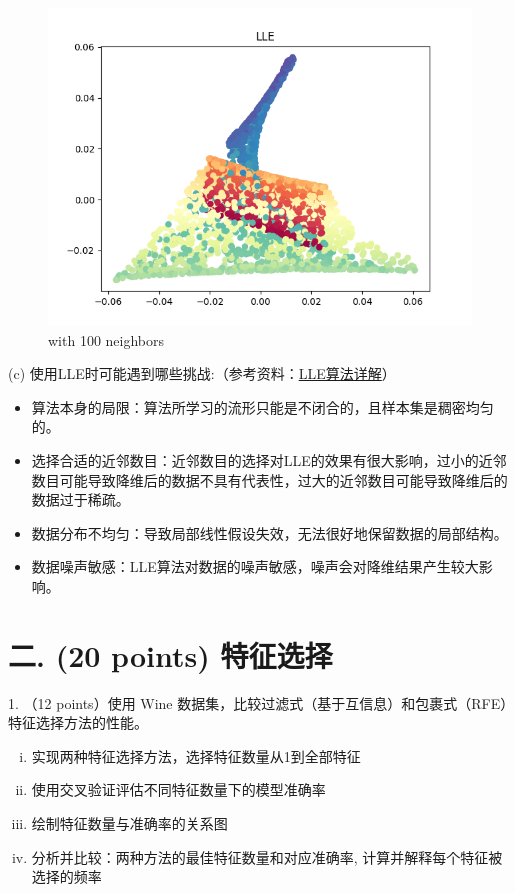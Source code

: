 \documentclass[8pt]{article}
\begin{document}
\begin{figure}[H]
\begin{minipage}{0.32\textwidth}
        \includegraphics[width=\textwidth]{./Prob1/task2/out/check/task2LLECheck_nei_100.png}
        \caption{with 100 neighbors}
        \label{fig:Swiss Roll after LLE with 100 neighbors}
    \end{minipage}
    \hfill
\end{figure}

(c) 使用LLE时可能遇到哪些挑战:（参考资料：\href{https://www.cnblogs.com/pinard/p/6266408.html}{LLE算法详解}）

\begin{itemize} 
    \item 算法本身的局限：算法所学习的流形只能是不闭合的，且样本集是稠密均匀的。
    \item 选择合适的近邻数目：近邻数目的选择对LLE的效果有很大影响，过小的近邻数目可能导致降维后的数据不具有代表性，过大的近邻数目可能导致降维后的数据过于稀疏。
    \item 数据分布不均匀：导致局部线性假设失效，无法很好地保留数据的局部结构。
    \item 数据噪声敏感：LLE算法对数据的噪声敏感，噪声会对降维结果产生较大影响。
\end{itemize}



\vspace{3em}

\newpage
\section*{二. (20 points) 特征选择}
1. （12 points）使用 Wine 数据集，比较过滤式（基于互信息）和包裹式（RFE）特征选择方法的性能。
\begin{enumerate}[(i)]
    \item 实现两种特征选择方法，选择特征数量从1到全部特征
    \item 使用交叉验证评估不同特征数量下的模型准确率
    \item 绘制特征数量与准确率的关系图
    \item 分析并比较：两种方法的最佳特征数量和对应准确率, 计算并解释每个特征被选择的频率
\end{enumerate}
\end{document}
